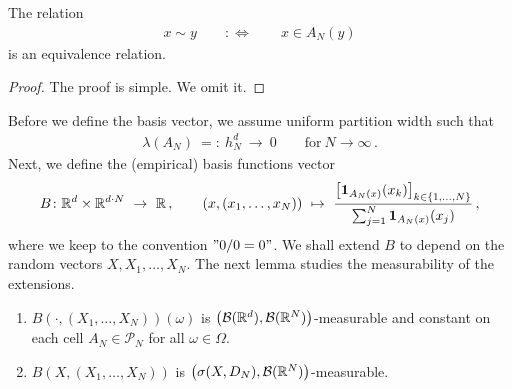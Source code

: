 \begin{lemma}
  \label{lem:basis_equiv_r}
  The relation
  \begin{align*}
    x\sim y
    \qquad
    :\Leftrightarrow
    \qquad
    x\in A_N(y)
  \end{align*}
  is an equivalence relation.
\end{lemma}
\begin{proof}
  The proof is simple. We omit it.
\end{proof}
Before we define the basis vector, we assume 
uniform partition width such that
\begin{align*}
  \lambda(A_N)
  \ 
  =:
  \ 
  h_N^d
  \ 
  \to
  \ 
  0 
  \qquad
  \text{for}\ N\to\infty
  \,.
\end{align*}
Next, we define the (empirical) basis functions vector
\begin{align}
  \label{def:basis}
  B\colon
  \R^d\times \R^{d\cdot N}
  \ 
  \to
  \ 
  \R
  \,,
  \qquad
  (x,(x_1,\ldots,x_N))
  \ 
  \mapsto
  \ 
  \frac
  {
    \left[
    \mathbf{1}
    _{
      A_N(x)
    }
    (x_k)
    \right]
    _{k\in \left\{
        1,\ldots,N
    \right\}}
  }
  {
    \sum_{j=1}^N
    \mathbf{1}
    _{
      A_N(x)
    }
    (x_j)
    }
  \,,
\end{align}
where we keep to the convention $"0/0=0"$.
We shall extend $B$ to depend on the random vectors
$X,X_1,\ldots,X_N$.
The next lemma studies the measurability of the extensions.
\begin{lemma}
  \label{lem:basis_meas}
  \begin{enumerate}[label=(\roman*)]
\item
  $B(\cdot,(X_1,\ldots,X_N))(\omega)$ is 
  $\left(
    \mathcal{B}(\mathbb{R}^d),\mathcal{B}(\mathbb{R}^N)
  \right)$-measurable
  and
  constant on each cell 
  $A_N\in\mathcal{P}_N$
  for all $\omega\in\Omega$. 
\item
  $B(X,(X_1,\ldots,X_N))$ is $\left(
    \sigma(X,D_N),\mathcal{B}(\mathbb{R}^N)
  \right)$-measurable. 
  \end{enumerate}
\end{lemma}
%
